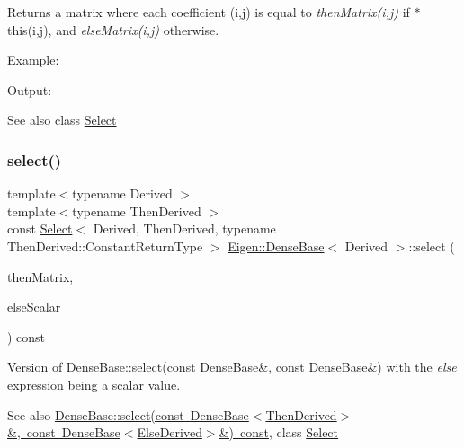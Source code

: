\begin{DoxyReturn}{Returns}
a matrix where each coefficient (i,j) is equal to {\itshape then\+Matrix(i,j)} if {\ttfamily $\ast$this}(i,j), and {\itshape else\+Matrix(i,j)} otherwise.
\end{DoxyReturn}
Example\+: 
\begin{DoxyCodeInclude}{0}
\end{DoxyCodeInclude}
 Output\+: 
\begin{DoxyVerbInclude}
\end{DoxyVerbInclude}


\begin{DoxySeeAlso}{See also}
class \mbox{\hyperlink{class_eigen_1_1_select}{Select}} 
\end{DoxySeeAlso}
\mbox{\label{class_eigen_1_1_dense_base_a57ef09a843004095f84c198dd145641b}} 
\subsubsection{\texorpdfstring{select()}{select()}\hspace{0.1cm}{\footnotesize\ttfamily [2/3]}}
{\footnotesize\ttfamily template$<$typename Derived $>$ \\
template$<$typename Then\+Derived $>$ \\
const \mbox{\hyperlink{class_eigen_1_1_select}{Select}}$<$ Derived, Then\+Derived, typename Then\+Derived\+::\+Constant\+Return\+Type $>$ \mbox{\hyperlink{class_eigen_1_1_dense_base}{Eigen\+::\+Dense\+Base}}$<$ Derived $>$\+::select (\begin{DoxyParamCaption}\item[{const \mbox{\hyperlink{class_eigen_1_1_dense_base}{Dense\+Base}}$<$ Then\+Derived $>$ \&}]{then\+Matrix,  }\item[{const typename Then\+Derived\+::\+Scalar \&}]{else\+Scalar }\end{DoxyParamCaption}) const\hspace{0.3cm}{\ttfamily [inline]}}

Version of Dense\+Base\+::select(const Dense\+Base\&, const Dense\+Base\&) with the {\itshape else} expression being a scalar value.

\begin{DoxySeeAlso}{See also}
\mbox{\hyperlink{class_eigen_1_1_dense_base_a65e78cfcbc9852e6923bebff4323ddca}{Dense\+Base\+::select(const Dense\+Base$<$\+Then\+Derived$>$\&, const Dense\+Base$<$\+Else\+Derived$>$\&) const}}, class \mbox{\hyperlink{class_eigen_1_1_select}{Select}} 
\end{DoxySeeAlso}
\mbox{\label{class_eigen_1_1_dense_base_a9e8e78c75887d4539071a0b7a61ca103}} 
